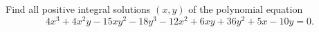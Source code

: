 Find all positive integral solutions $(x, y)$ of the polynomial equation
\[ 4x^3 + 4x^2y - 15xy^2 - 18y^3 - 12x^2 + 6xy + 36y^2 + 5x - 10y = 0. \]
